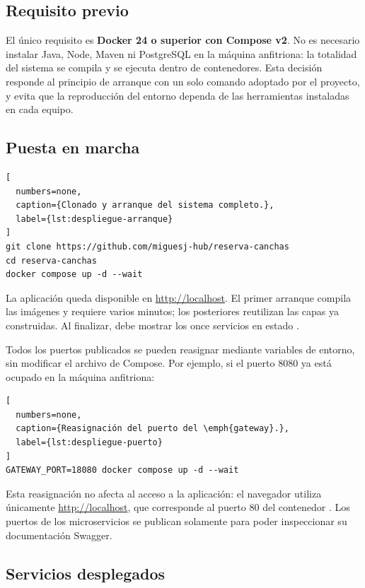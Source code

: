 \subsection{Requisito previo}
\label{anexo:despliegue:requisito}

El único requisito es \textbf{Docker 24 o superior con Compose v2}. No es
necesario instalar Java, Node, Maven ni PostgreSQL en la máquina anfitriona:
la totalidad del sistema se compila y se ejecuta dentro de contenedores. Esta
decisión responde al principio de arranque con un solo comando adoptado por el
proyecto, y evita que la reproducción del entorno dependa de las herramientas
instaladas en cada equipo.

\subsection{Puesta en marcha}
\label{anexo:despliegue:arranque}

\begin{lstlisting}[
  numbers=none,
  caption={Clonado y arranque del sistema completo.},
  label={lst:despliegue-arranque}
]
git clone https://github.com/miguesj-hub/reserva-canchas
cd reserva-canchas
docker compose up -d --wait
\end{lstlisting}

La aplicación queda disponible en \url{http://localhost}. El primer arranque
compila las imágenes y requiere varios minutos; los posteriores reutilizan las
capas ya construidas. Al finalizar,  debe mostrar los
once servicios en estado .

Todos los puertos publicados se pueden reasignar mediante variables de entorno,
sin modificar el archivo de Compose. Por ejemplo, si el puerto 8080 ya está
ocupado en la máquina anfitriona:

\begin{lstlisting}[
  numbers=none,
  caption={Reasignación del puerto del \emph{gateway}.},
  label={lst:despliegue-puerto}
]
GATEWAY_PORT=18080 docker compose up -d --wait
\end{lstlisting}

Esta reasignación no afecta al acceso a la aplicación: el navegador utiliza
únicamente \url{http://localhost}, que corresponde al puerto 80 del contenedor
. Los puertos de los microservicios se publican solamente para poder
inspeccionar su documentación Swagger.

\subsection{Servicios desplegados}
\label{anexo:despliegue:servicios}

